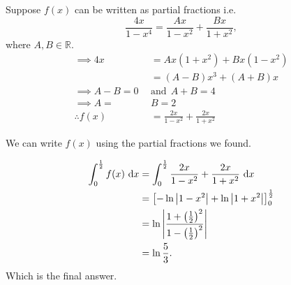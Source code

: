 \documentclass[a4paper, 11pt]{article}
\begin{document}
        \begin{questionparts}
            \item Suppose \(f(x) \) can be written as partial fractions i.e. 
            \[ \frac{4x}{1-x^4} = \frac{Ax }{1 -x^2} + \frac{Bx }{1 + x^2},  \] where \(A, B \in \mathbb{R }\). 
            \begin{align*}
                \implies 4x &= Ax(1+x^2) + Bx(1-x^2) \\
                &= (A-B)x^3 + (A+B)x \\
                \implies A - B = 0 ~~&\text{and}~~ A+B = 4 \\
                \implies A = ~&B = 2 \\
                \therefore f(x) &= \frac{2x}{1 - x^2} + \frac{2x}{1 + x^2}
            \end{align*}

            \item We can write \(f(x) \) using the partial fractions we found.
            
            \begin{align*}
                \int_{0}^{\frac{1}{2}} f(x) ~ \mathrm{d} x  &= \int_{0}^{\frac{1}{2}} \frac{2x}{1 - x^2} + \frac{2x}{1 + x^2} ~ \mathrm{d} x \\
                &= \left[ - \ln \left| 1 - x^2 \right| + \ln \left|1 + x^2 \right|\right]_0^\frac{1}{2} \\
                &= \ln \left| \frac{1+ \left(\frac{1}{2}\right)^2}{1 - \left(\frac{1}{2}\right)^2}\right| \\
                &= \ln \frac{5}{3}.
            \end{align*}
            Which is the final answer. 
        \end{questionparts}
\end{document}
